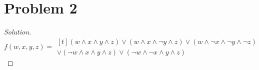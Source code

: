 \section*{Problem 2}
	\begin{proof} [Solution]
		\begin{equation*}
			f(w,x,y,z)=\begin{multlined}[t]
				(w\wedge x\wedge y\wedge z)\vee(w\wedge x\wedge \neg y\wedge z)\vee(w\wedge\neg x\wedge\neg y\wedge \neg z)\\
				\vee(\neg w\wedge x\wedge y\wedge z)\vee(\neg w\wedge \neg x\wedge y\wedge z)
			\end{multlined}
		\end{equation*}
	\end{proof}